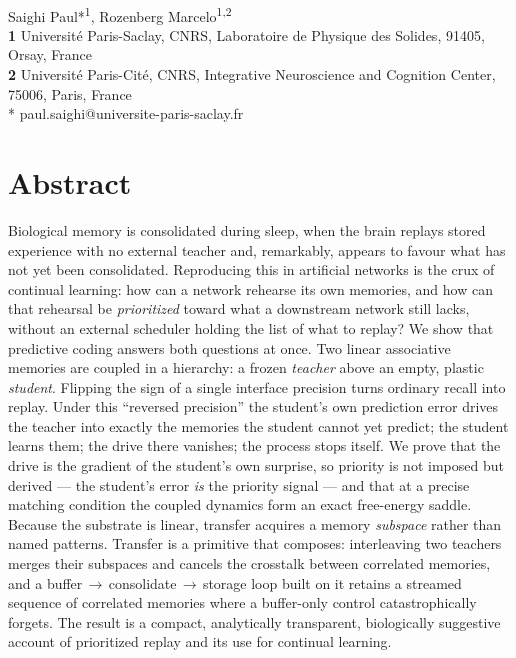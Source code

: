 \documentclass[10pt,letterpaper]{article}
\theoremstyle{plain}
\theoremstyle{remark}
\begin{document}
\vspace*{0.2in}
\begin{flushleft}
{\Large
\textbf{}
}
\newline
\\
Saighi Paul*\textsuperscript{1},
Rozenberg Marcelo\textsuperscript{1,2}
\\
\bigskip
\textbf{1} Universit\'e Paris-Saclay, CNRS, Laboratoire de Physique des Solides, 91405, Orsay, France
\\
\textbf{2} Universit\'e Paris-Cit\'e, CNRS, Integrative Neuroscience and Cognition Center, 75006, Paris, France
\\
\bigskip
* paul.saighi@universite-paris-saclay.fr
\end{flushleft}

\section*{Abstract}
Biological memory is consolidated during sleep, when the brain replays stored experience with no
external teacher and, remarkably, appears to favour what has not yet been consolidated. Reproducing
this in artificial networks is the crux of continual learning: how can a network rehearse its own
memories, and how can that rehearsal be \emph{prioritized} toward what a downstream network still
lacks, without an external scheduler holding the list of what to replay? We show that predictive
coding answers both questions at once. Two linear associative memories are coupled in a hierarchy: a
frozen \emph{teacher} above an empty, plastic \emph{student}. Flipping the sign of a single
interface precision turns ordinary recall into replay. Under this ``reversed precision'' the student's
own prediction error drives the teacher into exactly the memories the student cannot yet predict; the
student learns them; the drive there vanishes; the process stops itself. We prove that the drive is
the gradient of the student's own surprise, so priority is not imposed but derived --- the student's
error \emph{is} the priority signal --- and that at a precise matching condition the coupled dynamics
form an exact free-energy saddle. Because the substrate is linear, transfer acquires a memory
\emph{subspace} rather than named patterns. Transfer is a primitive that composes: interleaving two
teachers merges their subspaces and cancels the crosstalk between correlated memories, and a
buffer\,$\to$\,consolidate\,$\to$\,storage loop built on it retains a streamed sequence of correlated
memories where a buffer-only control catastrophically forgets. The result is a compact, analytically
transparent, biologically suggestive account of prioritized replay and its use for continual learning.
\end{document}
